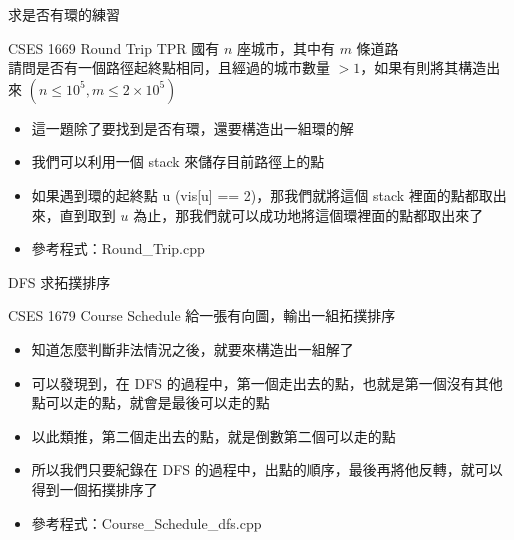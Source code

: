\documentclass[aspectratio=169]{beamer}
\begin{document}
    \begin{frame}{求是否有環的練習}
        \begin{block}{CSES 1669 Round Trip}
            TPR 國有 $n$ 座城市，其中有 $m$ 條道路\\
            請問是否有一個路徑起終點相同，且經過的城市數量 $> 1$，如果有則將其構造出來 $(n \le 10^5, m \le 2 \times 10^5)$
        \end{block}

        \begin{itemize}
            \item<1-> 這一題除了要找到是否有環，還要構造出一組環的解
            \item<2-> 我們可以利用一個 stack 來儲存目前路徑上的點
            \item<3-> 如果遇到環的起終點 u (vis[u] == 2)，那我們就將這個 stack 裡面的點都取出來，直到取到 $u$ 為止，那我們就可以成功地將這個環裡面的點都取出來了
            \item<3-> 參考程式：Round\_Trip.cpp
        \end{itemize}
    \end{frame}

    \begin{frame}{DFS 求拓撲排序}
        \begin{block}{CSES 1679 Course Schedule}
            給一張有向圖，輸出一組拓撲排序
        \end{block}

        \begin{itemize}
            \item<1-> 知道怎麼判斷非法情況之後，就要來構造出一組解了
            \item<2-> 可以發現到，在 DFS 的過程中，第一個走出去的點，也就是第一個沒有其他點可以走的點，就會是最後可以走的點
            \item<3-> 以此類推，第二個走出去的點，就是倒數第二個可以走的點
            \item<4-> 所以我們只要紀錄在 DFS 的過程中，出點的順序，最後再將他反轉，就可以得到一個拓撲排序了
            \item<4-> 參考程式：Course\_Schedule\_dfs.cpp
        \end{itemize}
    \end{frame}
\end{document}
